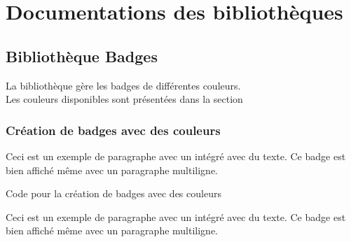 \part{Documentations des bibliothèques}

\chapter{Bibliothèque Badges}

La bibliothèque  gère les badges de différentes couleurs. \\Les couleurs disponibles sont présentées dans la section 

\section{Création de badges avec des couleurs}


Ceci est un exemple de paragraphe avec un  intégré 
avec du texte. Ce badge est bien affiché même avec un paragraphe multiligne.\\


\begin{Latex}{Code pour la création de badges avec des couleurs}

Ceci est un exemple de paragraphe avec un  intégré avec du texte. Ce badge est bien affiché même avec un paragraphe multiligne.

\end{Latex}

